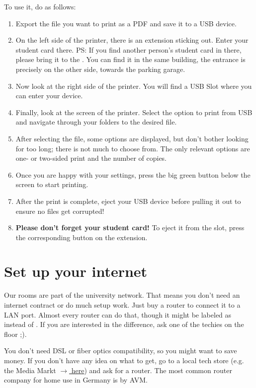To use it, do as follows:
\begin{enumerate}
    \item Export the file you want to print as a PDF and save it to a USB device.
    \item On the left side of the printer, there is an extension sticking out. Enter your student card there. PS: If you find another person's student card in there, please bring it to the . You can find it in the same building, the entrance is precisely on the other side, towards the parking garage.
    \item Now look at the right side of the printer. You will find a USB Slot where you can enter your device.
    \item Finally, look at the screen of the printer. Select the option to print from USB and navigate through your folders to the desired file.
    \item After selecting the file, some options are displayed, but don't bother looking for too long; there is not much to choose from. The only relevant options are one- or two-sided print and the number of copies.
    \item Once you are happy with your settings, press the big green button below the screen to start printing.
    \item After the print is complete, eject your USB device before pulling it out to ensure no files get corrupted!
    \item \textbf{Please don't forget your student card!} To eject it from the slot, press the corresponding button on the extension.
\end{enumerate}

\section{Set up your internet}
Our rooms are part of the university network. That means you don't need an internet contract or do much setup work. Just buy a router to connect it to a LAN port. Almost every router can do that, though it might be labeled as  instead of . If you are interested in the difference, ask one of the techies on the floor ;). 

You don't need DSL or fiber optics compatibility, so you might want to save money. If you don't have any idea on what to get, go to a local tech store (e.g. the Media Markt \href{https://maps.app.goo.gl/XmRXQEo6ihkXH9jS9}{$\xrightarrow{}$ here}) and ask for a router. The most common router company for home use in Germany is  by AVM.

